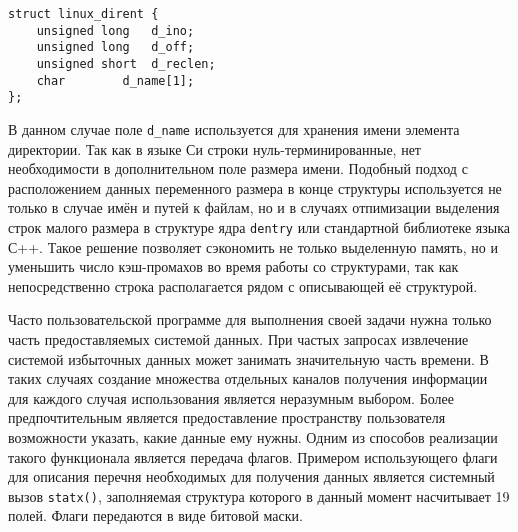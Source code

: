 \medskip
\begin{lstlisting}[style=cstyle]
struct linux_dirent {
	unsigned long	d_ino;
	unsigned long	d_off;
	unsigned short	d_reclen;
	char		d_name[1];
};
\end{lstlisting}
\medskip

В данном случае поле \texttt{d\_name} используется для хранения имени элемента
директории. Так как в языке Си строки нуль-терминированные, нет необходимости в
дополнительном поле размера имени. Подобный подход с расположением данных
переменного размера в конце структуры используется не только в случае имён и
путей к файлам, но и в случаях отпимизации выделения строк малого размера в
структуре ядра \texttt{dentry} или стандартной библиотеке языка С++. Такое
решение позволяет сэкономить не только выделенную память, но и уменьшить число
кэш-промахов во время работы со структурами, так как непосредственно строка
располагается рядом с описывающей её структурой.

Часто пользовательской программе для выполнения своей задачи нужна только часть
предоставляемых системой данных. При частых запросах извлечение системой
избыточных данных может занимать значительную часть времени. В таких случаях
создание множества отдельных каналов получения информации для каждого случая
использования является неразумным выбором. Более предпочтительным является
предоставление пространству пользователя возможности указать, какие данные ему
нужны. Одним из способов реализации такого функционала является передача флагов.
Примером использующего флаги для описания перечня необходимых для получения
данных является системный вызов \texttt{statx()}, заполняемая структура которого
в данный момент насчитывает 19 полей. Флаги передаются в виде битовой маски.
